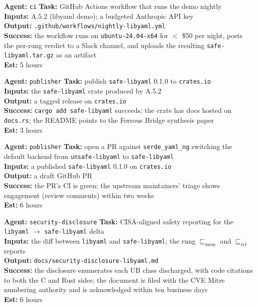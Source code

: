 \documentclass[12pt]{article}
\theoremstyle{definition}
\theoremstyle{remark}
\newcommand{\libyaml}{\texttt{libyaml}}
\newcommand{\safelibyaml}{\texttt{safe-libyaml}}
\newcommand{\unsafelibyaml}{\texttt{unsafe-libyaml}}
\newcommand{\Memory}{\ensuremath{\sqsubseteq_{\!\mathrm{mem}}}}
\newcommand{\Refine}{\ensuremath{\sqsubseteq_{\!\mathrm{ref}}}}
\newenvironment{tasklist}{%
  \begingroup\raggedright
  \begin{description}[style=nextline, leftmargin=1.4cm, itemsep=0.4em]
}{%
  \end{description}
  \endgroup
}
\begin{document}
\begin{tasklist}
\item[\textbf{Task A.5.5}] \textbf{Agent:} \texttt{ci} \quad
  \textbf{Task:} GitHub Actions workflow that runs the demo nightly\\
  \textbf{Inputs:} A.5.2 (libyaml demo); a budgeted Anthropic API key\\
  \textbf{Output:}
  \texttt{.github/workflows/nightly-libyaml.yml}\\
  \textbf{Success:} the workflow runs on \texttt{ubuntu-24.04-x64} for
  $<$ \$50 per night, posts the per-rung verdict to a Slack channel,
  and uploads the resulting \texttt{safe-libyaml.tar.gz} as an
  artifact\\
  \textbf{Est:} 5 hours

\item[\textbf{Task A.5.6}] \textbf{Agent:} \texttt{publisher} \quad
  \textbf{Task:} publish \safelibyaml{} 0.1.0 to \texttt{crates.io}\\
  \textbf{Inputs:} the \safelibyaml{} crate produced by A.5.2\\
  \textbf{Output:} a tagged release on \texttt{crates.io}\\
  \textbf{Success:} \texttt{cargo add safe-libyaml} succeeds; the
  crate has docs hosted on \texttt{docs.rs}; the README points to the
  Ferrous Bridge synthesis paper\\
  \textbf{Est:} 3 hours

\item[\textbf{Task A.5.7}] \textbf{Agent:} \texttt{publisher} \quad
  \textbf{Task:} open a PR against \texttt{serde\_yaml\_ng} switching
  the default backend from \unsafelibyaml{} to \safelibyaml{}\\
  \textbf{Inputs:} a published \safelibyaml{} 0.1.0 on
  \texttt{crates.io}\\
  \textbf{Output:} a draft GitHub PR\\
  \textbf{Success:} the PR's CI is green; the upstream maintainers'
  triage shows engagement (review comments) within two weeks\\
  \textbf{Est:} 6 hours

\item[\textbf{Task A.5.8}] \textbf{Agent:} \texttt{security-disclosure} \quad
  \textbf{Task:} CISA-aligned safety reporting for the \libyaml{}
  $\to$ \safelibyaml{} delta\\
  \textbf{Inputs:} the diff between \libyaml{} and \safelibyaml{};
  the rung \(\Memory\) and \(\Refine\) reports\\
  \textbf{Output:}
  \texttt{docs/security-disclosure-libyaml.md}\\
  \textbf{Success:} the disclosure enumerates each UB class
  discharged, with code citations to both the C and Rust sides; the
  document is filed with the CVE Mitre numbering authority and is
  acknowledged within ten business days\\
  \textbf{Est:} 6 hours
\end{tasklist}
\end{document}
